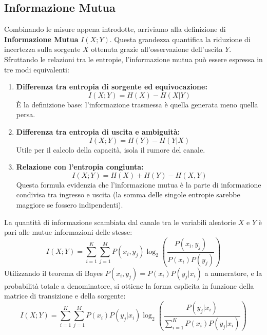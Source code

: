 \subsection{Informazione Mutua}
Combinando le misure appena introdotte, arriviamo alla definizione di \textbf{Informazione Mutua} $I(X;Y)$.
Questa grandezza quantifica la riduzione di incertezza sulla sorgente $X$ ottenuta grazie all'osservazione dell'uscita $Y$.
Sfruttando le relazioni tra le entropie, l'informazione mutua può essere espressa in tre modi equivalenti:
\begin{enumerate}
\item \textbf{Differenza tra entropia di sorgente ed equivocazione:}
\[ I(X;Y) = H(X) - H(X|Y) \]
È la definizione base: l'informazione trasmessa è quella generata meno quella persa.

\item \textbf{Differenza tra entropia di uscita e ambiguità:}
\[ I(X;Y) = H(Y) - H(Y|X) \]
Utile per il calcolo della capacità, isola il rumore del canale.

\item \textbf{Relazione con l'entropia congiunta:}
\[ I(X;Y) = H(X) + H(Y) - H(X,Y)\]
Questa formula evidenzia che l'informazione mutua è la parte di informazione condivisa tra ingresso e uscita (la somma delle singole entropie sarebbe maggiore se fossero indipendenti).
\end{enumerate}

La quantità di informazione scambiata dal canale tra le variabili aleatorie $X$ e $Y$ è pari alle mutue informazioni delle stesse:
\[I(X;Y) = \sum_{i=1}^K \sum_{j=1}^M P(x_i,y_j) \log_2\left(\frac{P(x_i,y_j)}{P(x_i)P(y_j)}\right)\]
Utilizzando il teorema di Bayes $P(x_i,y_j) = P(x_i)P(y_j|x_i)$ a numeratore, e la probabilità totale a denominatore, si ottiene la forma esplicita in funzione della matrice di transizione e della sorgente:
\[I(X;Y) = \sum_{i=1}^K \sum_{j=1}^M P(x_i)P(y_j|x_i) \log_2 \left( \frac{P(y_j|x_i)}{\sum_{i=1}^K P(x_i)P(y_j|x_i)} \right)\]

